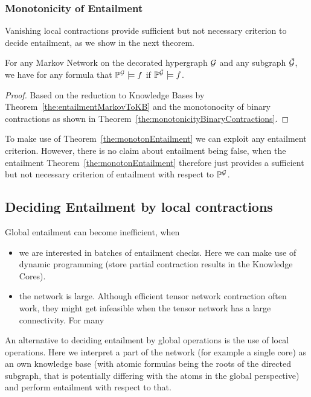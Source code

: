 \subsubsection{Monotonicity of Entailment}


Vanishing local contractions provide sufficient but not necessary criterion to decide entailment, as we show in the next theorem.

\begin{theorem}\label{the:monotonEntailment}
	For any Markov Network on the decorated hypergraph $\mathcal{G}$ and any subgraph $\tilde{\mathcal{G}}$, we have for any formula that $\mathbb{P}^{\mathcal{G}}\models f$ if $\mathbb{P}^{\tilde{\mathcal{G}}}\models f$.
\end{theorem}	
\begin{proof}
	Based on the reduction to Knowledge Bases by Theorem~\ref{the:entailmentMarkovToKB} and the monotonocity of binary contractions as shown in Theorem~\ref{the:monotonicityBinaryContractions}.
\end{proof}



\begin{remark}
	To make use of Theorem~\ref{the:monotonEntailment} we can exploit any entailment criterion.
	However, there is no claim about entailment being false, when the entailment 
	Theorem~\ref{the:monotonEntailment} therefore just provides a sufficient but not necessary criterion of entailment with respect to $\mathbb{P}^{\mathcal{G}}$.
\end{remark}



\subsection{Deciding Entailment by local contractions}\label{subsec:LocalEntailment}


Global entailment can become inefficient, when
\begin{itemize}
	\item we are interested in batches of entailment checks. Here we can make use of dynamic programming (store partial contraction results in the Knowledge Cores).
	\item the network is large. Although efficient tensor network contraction often work, they might get infeasible when the tensor network has a large connectivity. For many 
\end{itemize}
An alternative to deciding entailment by global operations is the use of local operations.
Here we interpret a part of the network (for example a single core) as an own knowledge base (with atomic formulas being the roots of the directed subgraph, that is potentially differing with the atoms in the global perspective) and perform entailment with respect to that.

